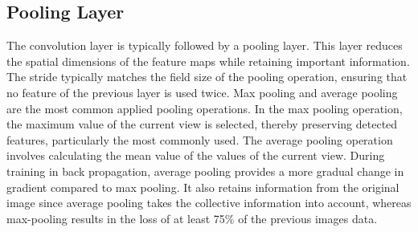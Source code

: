 \documentclass[
a4paper, 
12pt,
grayscalebody, %
abstract=on,
twoside, BCOR10mm, 12pt, DIV13,headinclude, footexclude, final, abstracton, openright
]{ibireprt}
\numberwithin{equation}{chapter}
\numberwithin{table}{chapter}
\numberwithin{figure}{chapter}
\numberwithin{algorithm}{chapter}
\numberwithin{example}{chapter}
\numberwithin{example}{chapter}
\begin{document}
\subsection{Pooling Layer}
The convolution layer is typically followed by a pooling layer. This layer reduces the spatial dimensions of the feature maps while retaining important information. The stride typically matches the field size of the pooling operation, ensuring that no feature of the previous layer is used twice. Max pooling and average pooling are the most common applied pooling operations. In the max pooling operation, the maximum value of the current view is selected, thereby preserving detected features, particularly the most commonly used. The average pooling operation involves calculating the mean value of the values of the current view. During training in back propagation, average pooling provides a more gradual change in gradient compared to max pooling. It also retains information from the original image since average pooling takes the collective information into account, whereas max-pooling results in the loss of at least 75\% of the previous images data. 
\end{document}
